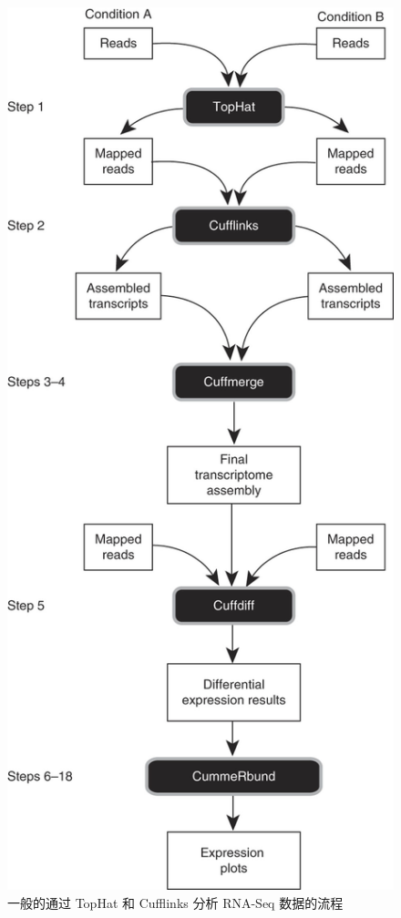 \begin{figure}[!t]
\centering
\includegraphics[height=\textheight]{figures/tuxedo-protocol-tophat-cufflinks.jpg}
\caption{一般的通过 TopHat \cite {trapnell2009tophat} 和 Cufflinks 
\cite{cufflinks.2010} 分析 RNA-Seq 数据的流程 \cite{trapnell2012differential}}
\label{intro-rna-seq-anal}
\end{figure}

